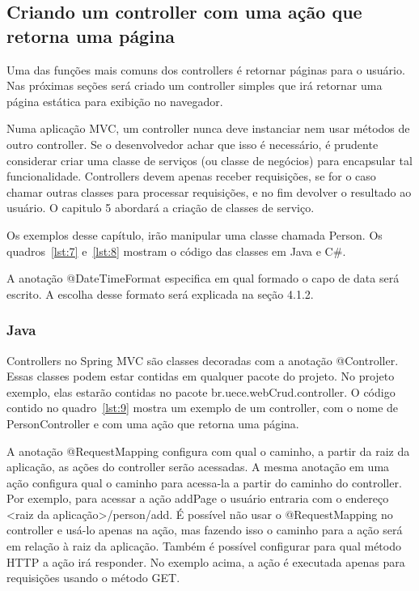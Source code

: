 \documentclass[a4paper,12pt]{article}
\newcommand{\javacode}[3] {
	
	\FloatBarrier
}
\newcommand{\sharpcode}[3] {
	
	\FloatBarrier
}
\begin{document}
\subsection{Criando um controller com uma ação que retorna uma página}

Uma das funções mais comuns dos controllers é retornar páginas para o usuário. Nas próximas seções será criado um controller simples que irá retornar uma página estática para exibição no navegador.

Numa aplicação MVC, um controller nunca deve instanciar nem usar métodos de outro controller. Se o desenvolvedor achar que isso é necessário, é prudente considerar criar uma classe de serviços (ou classe de negócios) para encapsular tal funcionalidade. Controllers devem apenas receber requisições, se for o caso chamar outras classes para processar requisições, e no fim devolver o resultado ao usuário. O capitulo 5 abordará a criação de classes de serviço.

Os exemplos desse capítulo, irão manipular uma classe chamada Person. Os quadros~\ref{lst:7} e~\ref{lst:8} mostram o código das classes em Java e C\#.

\javacode{code/7.txt}{Classe Person em Java}{lst:7}

A anotação @DateTimeFormat especifica em qual formado o capo de data será escrito. A escolha desse formato será explicada na seção 4.1.2.

\sharpcode{code/8.txt}{Classe Person em C\#}{lst:8}

\subsubsection{Java}

Controllers no Spring MVC são classes decoradas com a anotação @Controller. Essas classes podem estar contidas em qualquer pacote do projeto. No projeto exemplo, elas estarão contidas no pacote br.uece.webCrud.controller. O código contido no quadro~\ref{lst:9} mostra um exemplo de um controller, com o nome de PersonController e com uma ação que retorna uma página.

\javacode{code/9.txt}{PersonController no projeto Spring}{lst:9}

A anotação @RequestMapping configura com qual o caminho, a partir da raiz da aplicação, as ações do controller serão acessadas. A mesma anotação em uma ação configura qual o caminho para acessa-la a partir do caminho do controller. Por exemplo, para acessar a ação addPage o usuário entraria com o endereço <raiz da aplicação>/person/add. É possível não usar o @RequestMapping no controller e usá-lo apenas na ação, mas fazendo isso o caminho para a ação será em relação à raiz da aplicação. Também é possível configurar para qual método HTTP a ação irá responder. No exemplo acima, a ação é executada apenas para requisições usando o método GET.
\end{document}
